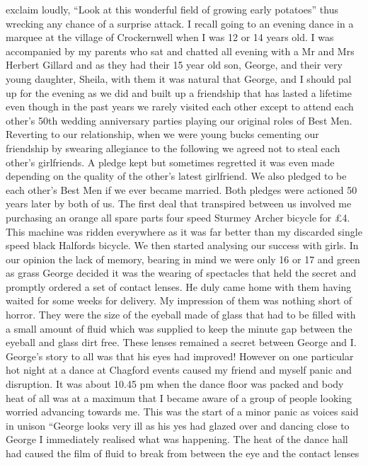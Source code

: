 exclaim loudly, ``Look at this wonderful field of growing early potatoes'' thus
wrecking any chance of a surprise attack. I recall going to an evening dance in
a marquee at the village of Crockernwell when I was 12 or 14 years old.  I was
accompanied by my parents who sat and chatted all evening with a Mr and Mrs
Herbert Gillard and as they had their 15 year old son, George, and their very
young daughter, Sheila, with them it was natural that George, and I should pal
up for the evening as we did and built up a friendship that has lasted a
lifetime even though in the past years we rarely visited each other except to
attend each other's 50th wedding anniversary parties playing our original roles
of Best Men.  Reverting to our relationship, when we were young bucks cementing
our friendship by swearing allegiance to the following we agreed not to steal
each other's girlfriends.  A pledge kept but sometimes regretted it was even
made depending on the quality of the other's latest girlfriend.  We also
pledged to be each other's Best Men if we ever became married.   Both pledges
were actioned 50 years later by both of us. The first deal that transpired
between us involved me purchasing an orange all spare parts four speed Sturmey
Archer bicycle for £4.  This machine was ridden everywhere as it was far better
than my discarded single speed black Halfords bicycle. We then started
analysing our success with girls.  In our opinion the lack of memory, bearing
in mind we were only 16 or 17 and green as grass George decided it was the
wearing of spectacles that held the secret and promptly ordered a set of
contact lenses.  He duly came home with them having waited for some weeks for
delivery.  My impression of them was nothing short of horror.  They were the
size of the eyeball made of glass that had to be filled with a small amount of
fluid which was supplied to keep the minute gap between the eyeball and glass
dirt free. These lenses remained a secret between George and I.  George's story
to all was that his eyes had improved! However on one particular hot night at a
dance at Chagford events caused my friend and myself panic and disruption.  It
was about 10.45 pm when the dance floor was packed and body heat of all was at
a maximum that I became aware of a group of people looking worried advancing
towards me.  This was the start of a minor panic as voices said in unison
``George looks very ill as his yes had glazed over and dancing close to George
I immediately realised what was happening.  The heat of the dance hall had
caused the film of fluid to break from between the eye and the contact lenses
